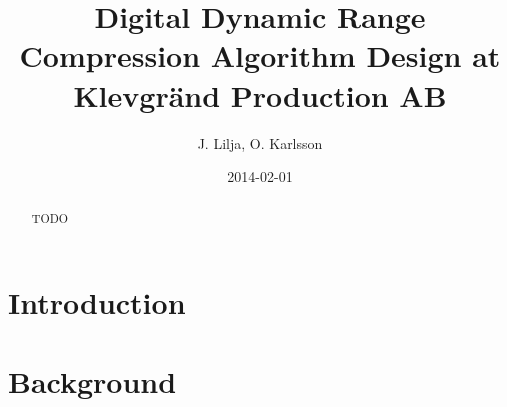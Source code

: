 \documentclass[]{article}
\begin{document}
\title{Digital Dynamic Range Compression Algorithm Design at Klevgränd Production AB}
\author{J. Lilja, O. Karlsson}
\date{2014-02-01}
\maketitle

\begin{abstract}
TODO
\end{abstract}

\clearpage
\section{Introduction}
\section{Background}




\end{document}

